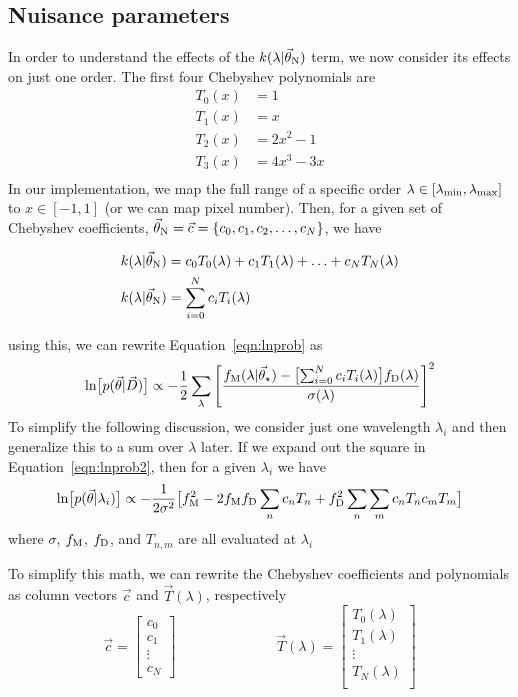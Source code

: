 \documentclass[preprint]{aastex} %
\newcommand{\vt}{\vec{\theta}}
\newcommand{\vstar}{\vt_{\star}}
\newcommand{\vN}{\vt_{\rm N}}
\newcommand{\vc}{\vec{c}}
\newcommand{\fM}{f_{\rm M}}
\newcommand{\fD}{f_{\rm D}}
\newcommand{\vD}{\vec{D}}
\begin{document}
\subsection{Nuisance parameters}
In order to understand the effects of the $k(\lambda | \vN)$ term, we now consider its effects on just one order. The first four Chebyshev polynomials are 
\begin{align*}
  T_0(x) &= 1\\
  T_1(x) &= x\\
  T_2(x) &= 2 x^2 - 1\\
  T_3(x) &= 4 x^3 - 3x\\
\end{align*}
In our implementation, we map the full range of a specific order $\lambda \in [\lambda_{\rm min}, \lambda_{\rm max}]$ to $x \in [-1, 1]$ (or we can map pixel number). Then, for a given set of Chebyshev coefficients, $\vN = \vc = \{ c_0, c_1, c_2, \ldots, c_N \}$, we have 

\begin{align}
  k(\lambda | \vN) &= c_0 T_0(\lambda) + c_1 T_1(\lambda) + \ldots + c_N T_N(\lambda) \\
  k(\lambda | \vN) &= \sum^N_{i = 0} c_i T_i(\lambda)
\end{align}

using this, we can rewrite Equation~\ref{eqn:lnprob} as 
\begin{equation}
  \ln \bigl [p(\vt | \vD) \bigr] \propto - \frac{1}{2} \sum_\lambda \left [\frac{\fM(\lambda | \vstar) - \bigl [ \sum^N_{i = 0} c_i T_i(\lambda) \bigr ] \fD(\lambda) }{\sigma(\lambda)} \right ]^2
  \label{eqn:lnprob2}
\end{equation}
To simplify the following discussion, we consider just one wavelength $\lambda_i$ and then generalize this to a sum over $\lambda$ later. If we expand out the square in Equation~\ref{eqn:lnprob2}, then for a given $\lambda_i$ we have
\begin{equation}
 \ln \bigl [p(\vt | \lambda_i) \bigr] \propto -\frac{1}{2 \sigma^2} \bigl [ \fM^2 - 2 \fM \fD \sum_n c_n T_n + \fD^2 \sum_n \sum_m c_n T_n c_m T_m \bigr ]
 \label{eqn:lnprob_lambda}
 \end{equation}
 where $\sigma$, $\fM$, $\fD$, and $T_{n,m}$ are all evaluated at $\lambda_i$

To simplify this math, we can rewrite the Chebyshev coefficients and polynomials as column vectors $\vc$ and $\vec{T}(\lambda)$, respectively
\begin{equation}
  \vc = 
  \begin{bmatrix}
    c_0\\
    c_1\\
    \vdots\\
    c_N
  \end{bmatrix}
  \hspace{3cm}
\vec{T}(\lambda) = 
\begin{bmatrix}
T_0(\lambda)\\
T_1(\lambda)\\
\vdots\\
T_N(\lambda)\\
\end{bmatrix}
\end{equation}
\end{document}
